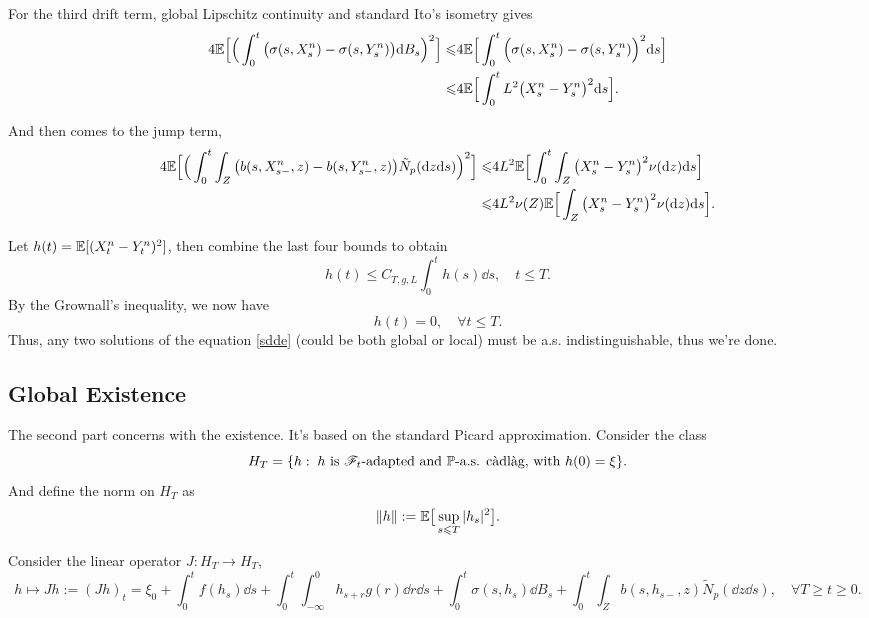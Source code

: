 \documentclass[8pt,onesided]{article}
\begin{document}
For the third drift term, global Lipschitz continuity and standard Ito's isometry gives 
\begin{align*}
    4\mathbb{E}\Big[\Big(\int_0^t \big(\sigma(s, X^n_s)-\sigma(s, Y_s^n)\big)\dd B_s \Big)^2\Big]\leqslant &
    4\mathbb{E}\Big[ \int_0^t  \Big(\sigma(s,X^n_s)-\sigma(s,Y^n_s) \Big)^2 \dd s\Big]\\
    \leqslant& 4 \mathbb{E} \Big[ \int_0^t L^2 \big(X^n_s-Y^n_s\big)^2 \dd s \Big].
\end{align*}

And then comes to the jump term, 
\begin{align*}
    4\mathbb{E}\Big[\Big(\int_0^t \int_Z \big(b(s, X^n_{s-},z)-b(s, Y^n_{s-},z)\big)\tilde N_p(\dd z \dd s)\Big)^2\Big]\leqslant&4L^2\mathbb{E}\Big[\int_0^t  \int_Z   \big(X^n_s-Y^n_s\big)^2 \nu(\dd z)\dd s  \Big]\\
    \leqslant& 4L^2\nu(Z) \mathbb{E}\Big[\int_Z   \big(X^n_s-Y^n_s\big)^2 \nu(\dd z)\dd s\Big].
\end{align*}

Let $h(t)=\mathbb{E}[(X^n_t-Y^n_t)^2]$, then combine the last four bounds to obtain
\begin{equation*}
    h(t)\le C_{T,g,L} \int_0^t h(s)\dd s, \quad t\le T.
\end{equation*}
By the Grownall's inequality, we now have
\begin{equation*}
    h(t)=0,\quad \forall t\le T.
\end{equation*}
Thus, any two solutions of the equation \ref{sdde} (could be both global or local) must be a.s. indistinguishable, thus we're done.

\subsection{Global Existence}

The second part concerns with the existence. It's based on the standard Picard approximation. Consider the class
\begin{equation*}
    H_T=\{h: \;h\text{ is }\mathscr{F}_t \text{-adapted and }\mathbb{P}\text{-a.s. càdlàg, with }h(0)=\xi\}.
\end{equation*}
And define the norm on $H_T$ as
\begin{equation*}
\left\lVert h\right\rVert:=\mathbb{E}\big[ \sup_{s\leqslant T} |h_s|^2\big].
\end{equation*}

Consider the linear operator $J:H_T\to H_T$,
\begin{equation*}
    h\mapsto Jh:=(Jh)_t=\xi_0+\int_0^t f(h_s)\dd s +\int_0^t \int_{-\infty}^0 h_{s+r} g(r)\dd r \dd s +\int_0^t \sigma(s, h_s)\dd B_s +\int_0^t \int_Z b(s, h_{s-},z)\tilde N_p(\dd z \dd s), \quad \forall T\ge t\ge0.
\end{equation*}
\end{document}
